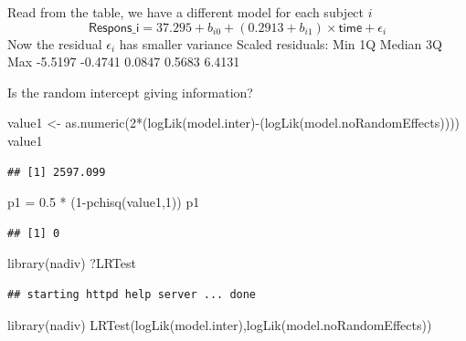 \documentclass[
]{article}
\newenvironment{Shaded}{\begin{snugshade}}{\end{snugshade}}
\newcommand{\DecValTok}[1]{\textcolor[rgb]{0.00,0.00,0.81}{#1}}
\newcommand{\FloatTok}[1]{\textcolor[rgb]{0.00,0.00,0.81}{#1}}
\newcommand{\FunctionTok}[1]{\textcolor[rgb]{0.00,0.00,0.00}{#1}}
\newcommand{\NormalTok}[1]{#1}
\newcommand{\OtherTok}[1]{\textcolor[rgb]{0.56,0.35,0.01}{#1}}
\newcommand{\SpecialCharTok}[1]{\textcolor[rgb]{0.00,0.00,0.00}{#1}}
\begin{document}
Read from the table, we have a different model for each subject \(i\)
\[\textsf{Respons_i} = 37.295 + b_{i0} + (0.2913+b_{i1}) \times \textsf{time}+ \epsilon_i\]
Now the residual \(\epsilon_i\) has smaller variance Scaled residuals:
Min 1Q Median 3Q Max -5.5197 -0.4741 0.0847 0.5683 6.4131

Is the random intercept giving information?

\begin{Shaded}
\begin{Highlighting}[]
\NormalTok{value1 }\OtherTok{\textless{}{-}} \FunctionTok{as.numeric}\NormalTok{(}\DecValTok{2}\SpecialCharTok{*}\NormalTok{(}\FunctionTok{logLik}\NormalTok{(model.inter)}\SpecialCharTok{{-}}\NormalTok{(}\FunctionTok{logLik}\NormalTok{(model.noRandomEffects))))}
\NormalTok{value1}
\end{Highlighting}
\end{Shaded}

\begin{verbatim}
## [1] 2597.099
\end{verbatim}

\begin{Shaded}
\begin{Highlighting}[]
\NormalTok{p1 }\OtherTok{=} \FloatTok{0.5} \SpecialCharTok{*}\NormalTok{ (}\DecValTok{1}\SpecialCharTok{{-}}\FunctionTok{pchisq}\NormalTok{(value1,}\DecValTok{1}\NormalTok{))}
\NormalTok{p1}
\end{Highlighting}
\end{Shaded}

\begin{verbatim}
## [1] 0
\end{verbatim}

\begin{Shaded}
\begin{Highlighting}[]
\FunctionTok{library}\NormalTok{(nadiv)}
\NormalTok{?LRTest}
\end{Highlighting}
\end{Shaded}

\begin{verbatim}
## starting httpd help server ... done
\end{verbatim}

\begin{Shaded}
\begin{Highlighting}[]
\FunctionTok{library}\NormalTok{(nadiv)}
\FunctionTok{LRTest}\NormalTok{(}\FunctionTok{logLik}\NormalTok{(model.inter),}\FunctionTok{logLik}\NormalTok{(model.noRandomEffects))}
\end{Highlighting}
\end{Shaded}
\end{document}
